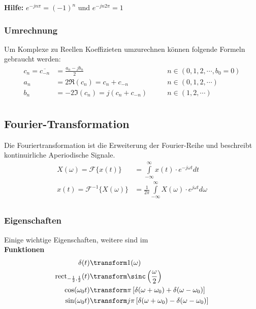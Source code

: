 \noindent\textbf{Hilfe:} $e^{-jn\pi} = (-1)^n$ und $e^{-jn2\pi} = 1$

\subsubsection{Umrechnung}\label{umrechnung}
Um Komplexe zu Reellen Koeffizieten umzurechnen können folgende Formeln gebraucht werden:
\begin{align*}
	c_n = \overline{c_{-n}} &= \frac{a_n - jb_n}{2} &\qquad n \in (0,1,2, \cdots, b_0 = 0) \\
	a_n &= 2\Re(c_n) = c_n + c_{-n}  &\qquad n \in (0,1,2, \cdots) \\
	b_n &= -2\Im(c_n) = j(c_n + c_{-n}) &\qquad n \in (1,2, \cdots) \\
\end{align*}



\subsection{Fourier-Transformation}
Die Fouriertransformation ist die Erweiterung der Fourier-Reihe und beschreibt kontinuirliche Aperiodische Signale.
\begin{align*}
	X(\omega) = \mathcal{F}\{x(t)\} &= \int\limits_{-\infty}^{\infty}x(t)\cdot e^{-j\omega t}dt \\
	x(t) = \mathcal{F}^{-1}\{X(\omega)\} &= \frac{1}{2\pi}\int\limits_{-\infty}^{\infty}X(\omega)\cdot e^{j\omega t}d\omega \\
\end{align*}

\subsubsection{Eigenschaften}
Einige wichtige Eigenschaften, weitere sind im \\
\noindent\textbf{Funktionen}
\begin{align*}
	\delta(t) &\transform 1(\omega) \\
	\text{rect}_{-\frac{1}{2},\frac{1}{2}}(t) &\transform \sinc\left(\frac{\omega}{2}\right) \\
	\cos(\omega_0 t) &\transform \pi\left[\delta(\omega + \omega_0) + \delta(\omega - \omega_0)\right] \\
	\sin(\omega_0 t) &\transform j\pi\left[\delta(\omega + \omega_0) - \delta(\omega - \omega_0)\right]
\end{align*}

